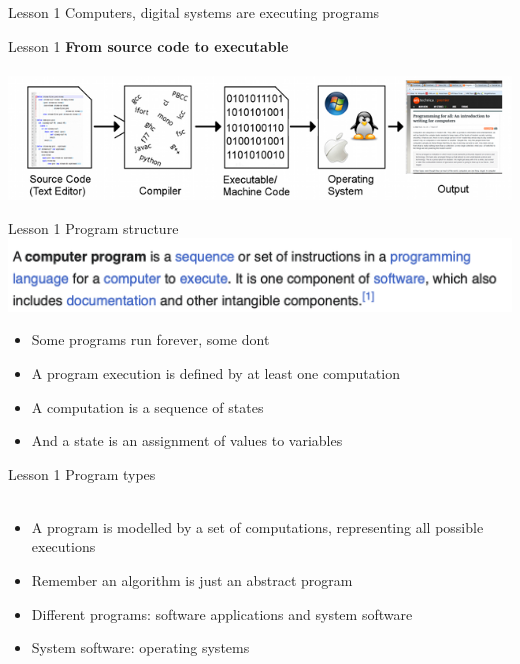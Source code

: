\documentclass[aspectratio=1610]{beamer}
\begin{document}
\begin{frame}{Lesson 1}{}
\Huge Computers, digital systems are executing programs
\end{frame}


\begin{frame}{Lesson 1}{}
\Large
\textbf{From source code to executable}\\~\\ 
\includegraphics[scale=0.65]{Images/CompilationChain}
\end{frame}


\begin{frame}{Lesson 1}{}
{\Huge{Program structure}}
\includegraphics[scale=0.67]{Images/program}

\Large{
\begin{itemize}
    \item Some programs run forever, some dont
    \item A program execution is defined by at least one computation
    \item A computation is a sequence of states
    \item And a state is an assignment of values to variables
\end{itemize}}

\end{frame}


\begin{frame}{Lesson 1}{}
{\Huge{Program types}}\\~\\ 

\Large{
\begin{itemize}
    \item A program is modelled by a set of computations, representing all possible executions
    \item Remember an algorithm is just an abstract program
    \item Different programs: software applications and system software
    \item System software: operating systems
\end{itemize}}
\end{frame}
\end{document}
